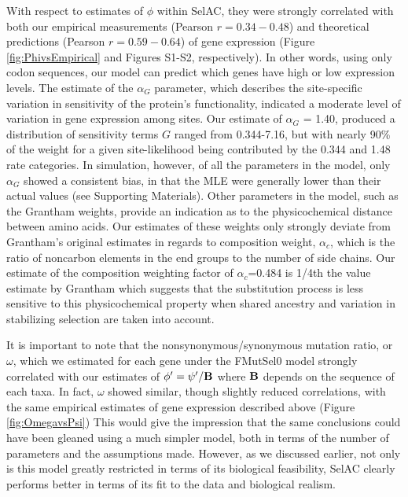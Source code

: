 \documentclass[12pt,letterpaper,fleqn]{article}
\newcommand{\Func}{\ensuremath{\text{\textbf{B}}}\xspace}
\newcommand{\selac}{SelAC\xspace}
\newcommand{\alphac}{\ensuremath{\alpha_c}\xspace}
\newcommand{\alphag}{\ensuremath{\alpha_G}\xspace}
\newcommand{\phiprime}{\ensuremath{\phi^\prime}\xspace}
\newcommand{\psiprime}{\ensuremath{\psi^\prime}\xspace}
\begin{document}
With respect to estimates of $\phi$ within \selac, they were strongly correlated with both our empirical measurements (Pearson $r = 0.34-0.48$) and theoretical predictions (Pearson $r = 0.59-0.64$) of gene expression (Figure \ref{fig:PhivsEmpirical} and Figures S1-S2, respectively).
In other words, using only codon sequences, our model can predict which genes have high or low expression levels.
The estimate of the $\alphag$ parameter, which describes the site-specific variation in sensitivity of the protein's functionality, indicated a moderate level of variation in gene expression among sites.
Our estimate of $\alphag$ = 1.40, produced a distribution of sensitivity terms $G$ ranged from 0.344-7.16, but with nearly 90\% of the weight for a given site-likelihood being contributed by the 0.344 and 1.48 rate categories.
In simulation, however, of all the parameters in the model, only $\alphag$ showed a consistent bias, in that the MLE were generally lower than their actual values (see Supporting Materials).
Other parameters in the model, such as the Grantham weights, provide an indication as to the physicochemical distance between amino acids.
Our estimates of these weights only strongly deviate from Grantham's \citeyear{Grantham1974} original estimates in regards to composition weight, $\alphac$, which is the ratio of noncarbon elements in the end groups to the number of side chains.
Our estimate of the composition weighting factor of $\alphac$=0.484 is 1/4th the value estimate by Grantham which suggests that the substitution process is less sensitive to this physicochemical property when shared ancestry and variation in stabilizing selection are taken into account.

It is important to note that the nonsynonymous/synonymous mutation ratio, or $\omega$, which we estimated for each gene under the FMutSel0 model strongly correlated with our estimates of $\phiprime = \psiprime/\Func$ where $\Func$ depends on the sequence of each taxa.
In fact, $\omega$ showed similar, though slightly reduced correlations, with the same empirical estimates of gene expression described above (Figure \ref{fig:OmegavsPsi})
This would give the impression that the same conclusions could have been gleaned using a much simpler model, both in terms of the number of parameters and the assumptions made.
However, as we discussed earlier, not only is this model greatly restricted in terms of its biological feasibility, \selac clearly performs better in terms of its fit to the data and biological realism.
\end{document}
